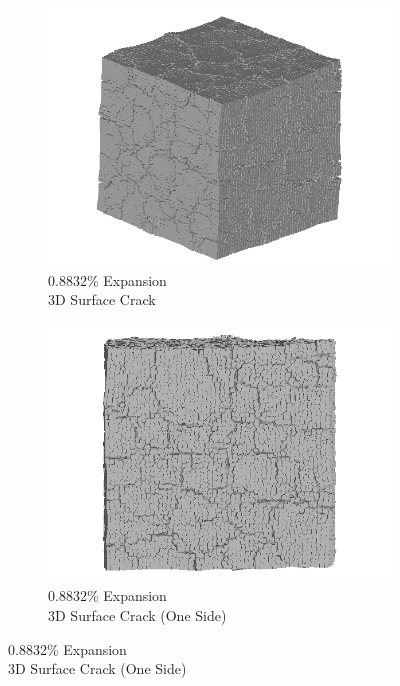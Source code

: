 \begin{figure}[ht!]
    \begin{subfigure}{.5\textwidth}
      \centering
      \includegraphics[width=0.5\linewidth]{Files/exp_3D/ASR/A30P75_4_3d.png}
      \caption{0.8832\% Expansion\\3D Surface Crack}
    \end{subfigure}%
    \begin{subfigure}{.5\textwidth}
      \centering
      \includegraphics[width=0.5\linewidth]{Files/exp_3D/ASR/A30P75_4_3ds.png}
      \caption{0.8832\% Expansion\\3D Surface Crack (One Side)}
    \end{subfigure}%
    

\end{figure}
